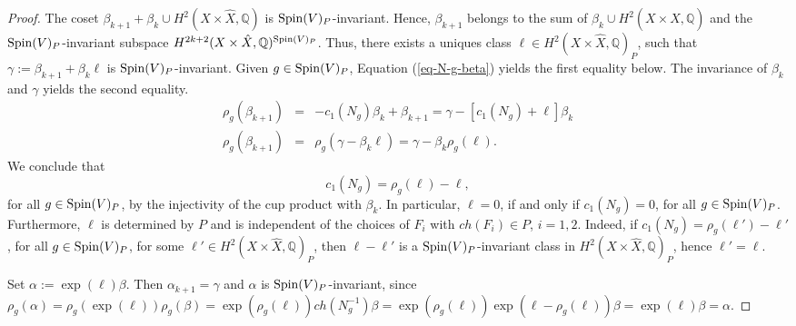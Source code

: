 \documentclass[12pt]{amsart}
\newcommand{\hide}[1]{}
\numberwithin{equation}{subsection}
\theoremstyle{plain}
\theoremstyle{definition}
\newcommand{\QQ}{{\mathbb Q}}
\newcommand{\Spin}{{\rm Spin}}
\begin{document}
\begin{proof}
The coset
$\beta_{k+1}+\beta_k\cup H^2(X\times\hat{X},\QQ)$ is $\Spin(V)_P$-invariant.
Hence, $\beta_{k+1}$  belongs to the sum of $\beta_k\cup H^2(X\times\hat{X},\QQ)$ and the $\Spin(V)_P$-invariant subspace $H^{2k+2}(X\times\hat{X},\QQ)^{\Spin(V)_P}$.
Thus, there exists a uniques class $\ell\in H^2(X\times\hat{X},\QQ)_P$, such that 
$\gamma:=\beta_{k+1}+\beta_k \ell$ is $\Spin(V)_P$-invariant. Given $g\in\Spin(V)_P$, 
Equation (\ref{eq-N-g-beta}) yields the first equality below. The invariance of $\beta_k$ and $\gamma$ yields  the  second equality.
\begin{eqnarray*}
\rho_g(\beta_{k+1})&=&-c_1(N_g)\beta_k+\beta_{k+1}=\gamma-[c_1(N_g)+\ell]\beta_k
\\
\rho_g(\beta_{k+1})&=&\rho_g(\gamma-\beta_k\ell)=\gamma-\beta_k\rho_g(\ell).
\end{eqnarray*}
We conclude that 
\[
c_1(N_g)=\rho_g(\ell)-\ell,
\] 
for all $g\in \Spin(V)_P$, by the injectivity of the cup product with $\beta_k$. In particular, $\ell=0$, if and only if $c_1(N_g)=0$,
for all $g\in\Spin(V)_P$. Furthermore, $\ell$ is determined by $P$ and is independent of the choices of $F_i$ with $ch(F_i)\in P$, $i=1,2$. Indeed, if $c_1(N_g)=\rho_g(\ell')-\ell'$, for all $g\in \Spin(V)_P$, for some $\ell'\in H^2(X\times\hat{X},\QQ)_P$,
then $\ell-\ell'$ is a $\Spin(V)_P$-invariant class in $H^2(X\times\hat{X},\QQ)_P$, hence $\ell'=\ell$.

Set $\alpha:=\exp(\ell)\beta$. Then $\alpha_{k+1}=\gamma$ and $\alpha$ is $\Spin(V)_P$-invariant, since
$
\rho_g(\alpha)=\rho_g(\exp(\ell))\rho_g(\beta)=\exp(\rho_g(\ell))ch(N_g^{-1})\beta=
\exp(\rho_g(\ell))\exp(\ell-\rho_g(\ell))\beta=\exp(\ell)\beta=\alpha.
$
\hide{
Case 1: If $\beta_1$ vanishes, then $\beta_2$
is $\Spin(V)_w$-invariant as well. It follows that $\beta_2$ is a scalar multiple of $\Theta_w^2$.

}
\end{proof}
\end{document}

